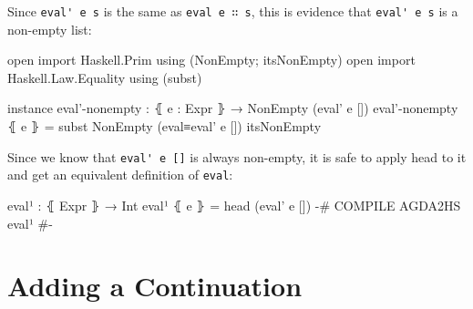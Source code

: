\documentclass{article}
\begin{document}
\noindent
Since \verb!eval' e s! is the same as \verb!eval e ∷ s!, this is evidence that \verb!eval' e s! is a non-empty list:

\begin{code}
  open import Haskell.Prim using (NonEmpty; itsNonEmpty)
  open import Haskell.Law.Equality using (subst)

  instance
    eval'-nonempty : ⦃ e : Expr ⦄ → NonEmpty (eval' e [])
    eval'-nonempty ⦃ e ⦄ = subst NonEmpty (eval≡eval' e []) itsNonEmpty
\end{code}

\noindent
Since we know that \verb!eval' e []! is always non-empty, it is safe to apply head to it and get an equivalent definition of \texttt{eval}:

\begin{code}
  eval¹ : ⦃ Expr ⦄ → Int
  eval¹ ⦃ e ⦄ = head (eval' e [])
  {-# COMPILE AGDA2HS eval¹ #-}
\end{code}

\section{Adding a Continuation}
\end{document}
